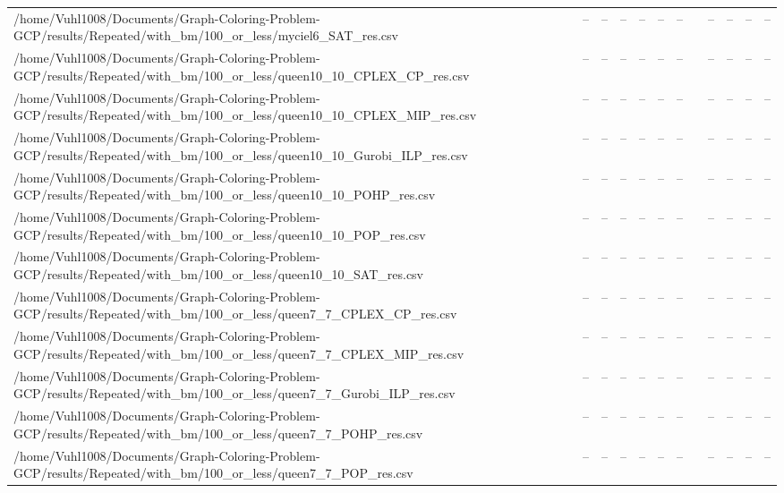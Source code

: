 \begin{table}[htbp]
\begin{tabular}{llllllllllll}
/home/Vuhl1008/Documents/Graph-Coloring-Problem-GCP/results/Repeated/with\_bm/100\_or\_less/myciel6\_SAT\_res.csv & -- & -- & -- & -- & -- & -- & {} & -- & -- & -- & -- \\
/home/Vuhl1008/Documents/Graph-Coloring-Problem-GCP/results/Repeated/with\_bm/100\_or\_less/queen10\_10\_CPLEX\_CP\_res.csv & -- & -- & -- & -- & -- & -- & {} & -- & -- & -- & -- \\
/home/Vuhl1008/Documents/Graph-Coloring-Problem-GCP/results/Repeated/with\_bm/100\_or\_less/queen10\_10\_CPLEX\_MIP\_res.csv & -- & -- & -- & -- & -- & -- & {} & -- & -- & -- & -- \\
/home/Vuhl1008/Documents/Graph-Coloring-Problem-GCP/results/Repeated/with\_bm/100\_or\_less/queen10\_10\_Gurobi\_ILP\_res.csv & -- & -- & -- & -- & -- & -- & {} & -- & -- & -- & -- \\
/home/Vuhl1008/Documents/Graph-Coloring-Problem-GCP/results/Repeated/with\_bm/100\_or\_less/queen10\_10\_POHP\_res.csv & -- & -- & -- & -- & -- & -- & {} & -- & -- & -- & -- \\
/home/Vuhl1008/Documents/Graph-Coloring-Problem-GCP/results/Repeated/with\_bm/100\_or\_less/queen10\_10\_POP\_res.csv & -- & -- & -- & -- & -- & -- & {} & -- & -- & -- & -- \\
/home/Vuhl1008/Documents/Graph-Coloring-Problem-GCP/results/Repeated/with\_bm/100\_or\_less/queen10\_10\_SAT\_res.csv & -- & -- & -- & -- & -- & -- & {} & -- & -- & -- & -- \\
/home/Vuhl1008/Documents/Graph-Coloring-Problem-GCP/results/Repeated/with\_bm/100\_or\_less/queen7\_7\_CPLEX\_CP\_res.csv & -- & -- & -- & -- & -- & -- & {} & -- & -- & -- & -- \\
/home/Vuhl1008/Documents/Graph-Coloring-Problem-GCP/results/Repeated/with\_bm/100\_or\_less/queen7\_7\_CPLEX\_MIP\_res.csv & -- & -- & -- & -- & -- & -- & {} & -- & -- & -- & -- \\
/home/Vuhl1008/Documents/Graph-Coloring-Problem-GCP/results/Repeated/with\_bm/100\_or\_less/queen7\_7\_Gurobi\_ILP\_res.csv & -- & -- & -- & -- & -- & -- & {} & -- & -- & -- & -- \\
/home/Vuhl1008/Documents/Graph-Coloring-Problem-GCP/results/Repeated/with\_bm/100\_or\_less/queen7\_7\_POHP\_res.csv & -- & -- & -- & -- & -- & -- & {} & -- & -- & -- & -- \\
/home/Vuhl1008/Documents/Graph-Coloring-Problem-GCP/results/Repeated/with\_bm/100\_or\_less/queen7\_7\_POP\_res.csv & -- & -- & -- & -- & -- & -- & {} & -- & -- & -- & -- \\

\end{tabular}
\end{table}
